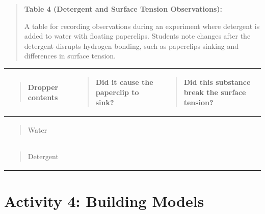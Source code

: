\documentclass[
  letterpaper,
  DIV=11,
  numbers=noendperiod]{scrreprt}
\newcounter{none} %
\begin{document}
\begin{quote}
\textbf{\hfill\break
Table 4 (Detergent and Surface Tension Observations):}

A table for recording observations during an experiment where detergent
is added to water with floating paperclips. Students note changes after
the detergent disrupts hydrogen bonding, such as paperclips sinking and
differences in surface tension.
\end{quote}

{\def\LTcaptype{none} %
\begin{longtable}[]{@{}
  >{\raggedright\arraybackslash}p{}
  >{\raggedright\arraybackslash}p{}
  >{\raggedright\arraybackslash}p{}@{}}
\toprule\noalign{}
\begin{minipage}[b]{\linewidth}\raggedright
\begin{quote}
\textbf{Dropper contents}
\end{quote}
\end{minipage} & \begin{minipage}[b]{\linewidth}\raggedright
\begin{quote}
\textbf{Did it cause the paperclip to sink?}
\end{quote}
\end{minipage} & \begin{minipage}[b]{\linewidth}\raggedright
\begin{quote}
\textbf{Did this substance break the surface tension?}
\end{quote}
\end{minipage} \\
\midrule\noalign{}
\endhead
\bottomrule\noalign{}
\endlastfoot
\begin{minipage}[t]{\linewidth}\raggedright
\begin{quote}
Water
\end{quote}
\end{minipage} & & \\
\begin{minipage}[t]{\linewidth}\raggedright
\begin{quote}
Detergent
\end{quote}
\end{minipage} & & \\
\end{longtable}
}

\section{\texorpdfstring{\textbf{Activity 4: Building
Models}}{Activity 4: Building Models}}\label{activity-4-building-models}
\end{document}
